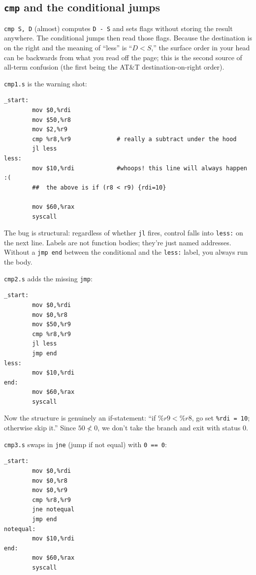 \documentclass[11pt]{article}
\begin{document}
\subsection*{\texttt{cmp} and the conditional jumps}

\texttt{cmp S, D} (almost) computes \texttt{D - S} and sets flags
without storing the result anywhere. The conditional jumps then read
those flags. Because the destination is on the right and the meaning
of ``less'' is ``$D < S$,'' the surface order in your head can be
backwards from what you read off the page; this is the second source
of all-term confusion (the first being the AT\&T destination-on-right
order).

\texttt{cmp1.s} is the warning shot:

\begin{lstlisting}
_start:
        mov $0,%rdi
        mov $50,%r8
        mov $2,%r9
        cmp %r8,%r9             # really a subtract under the hood
        jl less
less:
        mov $10,%rdi            #whoops! this line will always happen :(
        ##  the above is if (r8 < r9) {rdi=10}

        mov $60,%rax
        syscall
\end{lstlisting}

The bug is structural: regardless of whether \texttt{jl} fires,
control falls into \texttt{less:} on the next line. Labels are not
function bodies; they're just named addresses. Without a
\texttt{jmp end} between the conditional and the \texttt{less:}
label, you always run the body.

\texttt{cmp2.s} adds the missing \texttt{jmp}:

\begin{lstlisting}
_start:
        mov $0,%rdi
        mov $0,%r8
        mov $50,%r9
        cmp %r8,%r9
        jl less
        jmp end
less:
        mov $10,%rdi
end:
        mov $60,%rax
        syscall
\end{lstlisting}

Now the structure is genuinely an if-statement: ``if $\%r9 < \%r8$,
go set \texttt{\%rdi = 10}; otherwise skip it.'' Since
$50 \not< 0$, we don't take the branch and exit with status 0.

\texttt{cmp3.s} swaps in \texttt{jne} (jump if not equal) with
\texttt{0 == 0}:

\begin{lstlisting}
_start:
        mov $0,%rdi
        mov $0,%r8
        mov $0,%r9
        cmp %r8,%r9
        jne notequal
        jmp end
notequal:
        mov $10,%rdi
end:
        mov $60,%rax
        syscall
\end{lstlisting}
\end{document}
